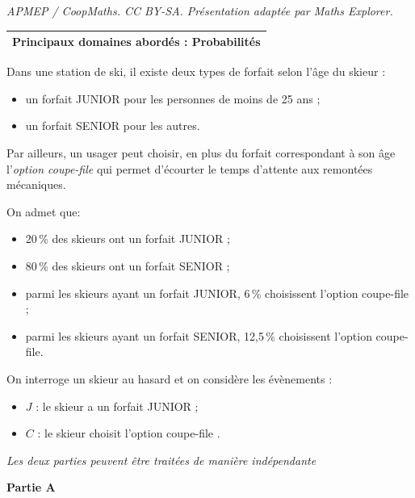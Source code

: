 \documentclass[10pt]{article}
\begin{document}
\noindent\textit{APMEP / CoopMaths. CC BY-SA. Présentation adaptée par Maths Explorer.}\par\medskip
\medskip

\begin{tabularx}{\linewidth}{|X|}\hline
\textbf{Principaux domaines abordés :} Probabilités\\ \hline
\end{tabularx}

\medskip

Dans une station de ski, il existe deux types de forfait selon l'âge du skieur :

\begin{itemize}
\item un forfait JUNIOR pour les personnes de moins de 25 ans ;
\item un forfait SENIOR pour les autres.
\end{itemize}

 Par ailleurs, un usager peut choisir, en plus du forfait correspondant à son âge l'\emph{option coupe-file} qui permet d'écourter le temps d'attente aux remontées mécaniques.

On admet que:
\begin{itemize}
\item[$\bullet~~$] 20\,\% des skieurs ont un forfait JUNIOR ;
\item[$\bullet~~$] 80\,\% des skieurs ont un forfait SENIOR ;
\item[$\bullet~~$] parmi les skieurs ayant un forfait JUNIOR, 6\,\% choisissent l'option coupe-file ;
\item[$\bullet~~$] parmi les skieurs ayant un forfait SENIOR, 12,5\,\% choisissent l'option coupe-file.
\end{itemize}

On interroge un skieur au hasard et on considère les évènements :

\begin{itemize}
\item[$\bullet~~$] $J$ : \og le skieur a un forfait JUNIOR \fg ;
\item[$\bullet~~$] $C$ : \og le skieur choisit l'option coupe-file \fg.
\end{itemize}

\medskip

\emph{Les deux parties peuvent être traitées de manière indépendante}

\bigskip

\textbf{Partie A}

\medskip
\end{document}
